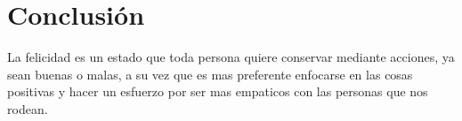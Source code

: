 \documentclass[12pt,letterpaper]{article}
\begin{document}
\section {Conclusión}
	
	La felicidad es un estado que toda persona quiere conservar mediante acciones, ya sean buenas o malas, a su vez que es mas preferente enfocarse en las cosas positivas y hacer un esfuerzo por ser mas empaticos con las personas que nos rodean.
\end{document}
